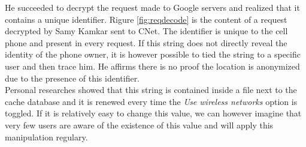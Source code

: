 He succeeded to decrypt the request made to Google servers and realized that it contains a unique identifier\cite{cnet-andr-samy}.
Rigure \ref{fig:reqdecode} is the content of a request decrypted by Samy Kamkar sent to CNet.
The identifier is unique to the cell phone and present in every request.
If this string does not directly reveal the identity of the phone owner, it is however possible to tied the string to a specific user and then trace him.
He affirms there is no proof the location is anonymized due to the presence of this identifier.\\

Personal researches showed that this string is contained inside a file next to the cache database and it is renewed every time the \emph{Use wireless networks} option is toggled.
If it is relatively easy to change this value, we can however imagine that very few users are aware of the existence of this value and will apply this manipulation regulary.





